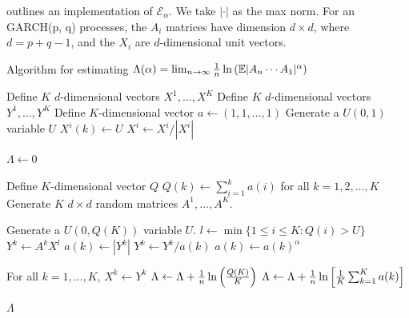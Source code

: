 \documentclass[aoas,preprint]{imsart}
\numberwithin{equation}{section}
\theoremstyle{plain}
\begin{document}
outlines an implementation of $\mathscr E_\alpha$. We take
$|\cdot|$ as the max norm.
For an GARCH(p, q) processes, the $A_i$ matrices have dimension
$d \times d$, where $d = p + q - 1$, and the $X_i$ are $d$-dimensional
unit vectors. 
\begin{algorithm}[H]
  \caption{Algorithm for estimating
    $\Lambda(\alpha) = \lim_{n \to \infty} {1 \over n} \ln\left(\mathbb{E} |A_n \cdots A_1|^\alpha \right)$}
  \label{alg:Lambda_estimation}
  \begin{algorithmic}
    \State Define $K$ $d$-dimensional vectors $X^1, \dots, X^K$
    \State Define $K$ $d$-dimensional vectors $Y^1, \dots, Y^K$
    \State Define $K$-dimensional vector $a \gets (1, 1, \dots, 1)$
    \State Generate a $U(0, 1)$ variable $U$
    \State $X^i(k) \gets U$ 
    \EndFor
    \State $X^i \gets X^i/|X^i|$
    \EndFor

    $\Lambda \gets 0$


    \State Define $K$-dimensional vector $Q$
    \State $Q(k) \gets \sum_{i=1}^k a(i)$ for all $k=1,2,\dots, K$
    \State Generate $K$ $d \times d$ random matrices $A^1, \dots, A^K$.

    \State Generate a $U(0, Q(K))$ variable $U$.
    \State $l \gets \min\{1 \leq i \leq K: Q(i) > U\}$
    \State $Y^k \gets A^k X^l$
    \State $a(k) \gets |Y^k|$
    \State $Y^k \gets Y^k/a(k)$
    \State $a(k) \gets a(k)^\alpha$
    \EndFor

    \State For all $k=1,\dots,K$, $X^k \gets Y^k$
    \State $\Lambda \gets \Lambda + {1 \over n}\ln\left( { Q(K) \over K} \right)$
    \EndFor
    \State $\Lambda \gets \Lambda + {1 \over n}\ln\left[ {1 \over K}\sum_{k=1}^K a(k) \right]$

    \Return $\Lambda$
    \EndProcedure
  \end{algorithmic}
\end{algorithm}
\end{document}
